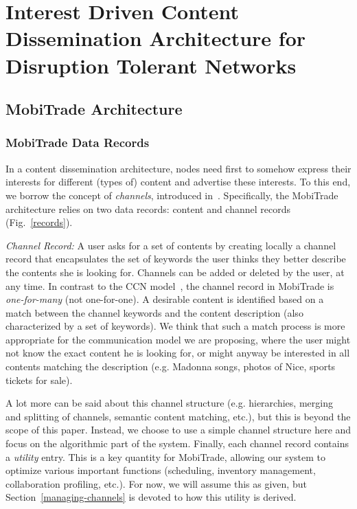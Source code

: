 \chapter{Interest Driven Content Dissemination Architecture for Disruption Tolerant Networks}
\label{chapter:PTMP}
\minitoc
\section{MobiTrade Architecture}
\label{MobiTrade-architecture}
\subsection{MobiTrade Data Records}
\label{content-channel-records}

In a content dissemination architecture, nodes need first to somehow express their interests for different (types of) content and advertise these interests. To this end, we borrow the concept of \emph{channels}, introduced in~\cite{May07wirelessopportunistic}. Specifically, the MobiTrade architecture relies on two data records: content and channel records (Fig.~\ref{records}).

\emph{Channel Record:} A user asks for a set of contents by creating locally a channel record that encapsulates the set of keywords the user thinks they better describe the contents she is looking for. Channels can be added or deleted by the user, at any time. In contrast to the CCN model~\cite{CCN}, the channel record in MobiTrade is \emph{one-for-many} (not one-for-one). A desirable content is identified based on a match between the channel keywords and the content description (also characterized by a set of keywords). We think that such a match process is more appropriate for the communication model we are proposing, where the user might not know the exact content he is looking for, or might anyway be interested in all contents matching the description (e.g. Madonna songs, photos of Nice, sports tickets for sale). 

A lot more can be said about this channel structure (e.g. hierarchies, merging and splitting of channels, semantic content matching, etc.), but this is beyond the scope of this paper. Instead, we choose to use a simple channel structure here and focus on the algorithmic part of the system. Finally, each channel record contains a \emph{utility} entry. This is a key quantity for MobiTrade, allowing our system to optimize various important functions (scheduling, inventory management, collaboration profiling, etc.). For now, we will assume this as given, but Section~\ref{managing-channels} is devoted to how this utility is derived.

